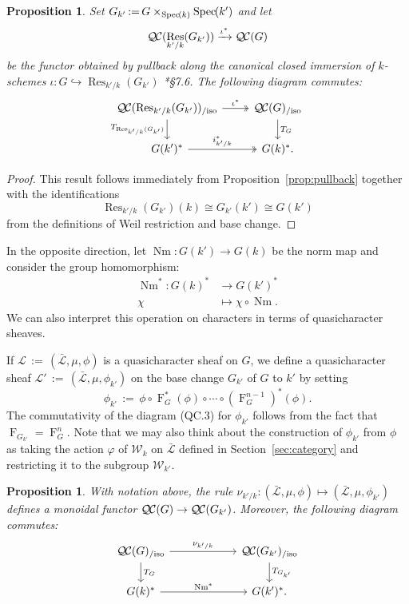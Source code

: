 \documentclass{amsart}
\theoremstyle{plain}
\newtheorem{proposition}[theorem]{Proposition}
\theoremstyle{definition}
\theoremstyle{remark}
\newcommand{\Weil}[1]{\mathcal{W}_{#1}}
\newcommand{\Frob}[1]{\operatorname{F}_{#1}}
\DeclareMathOperator{\Res}{Res}
\DeclareMathOperator{\Nm}{Nm}
\newcommand{\Spec}[1]{{\operatorname{Spec}\hskip-1pt( #1 )}}
\newcommand{\ceq}{{\, :=\, }}
\newcommand{\qcs}[1]{{\mathcal{#1}}}
\newcommand{\gqcs}[1]{{\mathcal{\bar #1}}}
\newcommand{\QC}{{\mathcal{Q\hskip-0.8pt C}}}
\newcommand{\QCiso}[1]{\QC(#1)_{/\text{iso}}}
\newcommand{\TrFrob}[1]{T_{#1}}
\begin{document}
\begin{proposition} \label{prop:csbe}
Set $G_{k'} \ceq G\times_\Spec{k} \Spec{k'}$ and let
\[
\QC(\Res_{k'/k}(G_{k'})) \xrightarrow{\iota^*} \QC(G)
\]
be the functor obtained by pullback along the canonical closed immersion of $k$-schemes
$\iota : G \hookrightarrow \Res_{k'/k}(G_{k'})$
\cite{bosch-lutkebohmert-reynaud:NeronModels}*{\S 7.6}.
The following diagram commutes:
\[
\begin{tikzcd}
\QCiso{\Res_{k'/k}(G_{k'})} \arrow[two heads]{r}{\iota^*} \dar[swap]{\TrFrob{\Res_{k'/k}(G_{k'})}} & \QCiso{G} \dar{\TrFrob{G}} \\
G(k')^* \arrow[two heads]{r}{i_{k'/k}^*} & G(k)^*.
\end{tikzcd}
\]
\end{proposition}
\begin{proof}
This result follows immediately from Proposition~\ref{prop:pullback} together with the identifications
\[
\Res_{k'/k}(G_{k'})(k) \cong G_{k'}(k') \cong G(k')
\]
from the definitions of Weil restriction and base change.
\end{proof}

In the opposite direction, let $\Nm : G(k') \to G(k)$ be the norm map and consider the group homomorphism:
\begin{align*}
\Nm^* : G(k)^* &\to G(k')^* \\
\chi &\mapsto \chi\circ \Nm.
\end{align*}
We can also interpret this operation on characters in terms of quasicharacter sheaves.

If $\qcs{L} \ceq (\gqcs{L}, \mu, \phi)$ is a quasicharacter sheaf on $G$, we define
a quasicharacter sheaf $\qcs{L}' \ceq (\gqcs{L}, \mu, \phi_{k'})$ on the base change
$G_{k'}$ of $G$ to $k'$ by setting
\[
\phi_{k'} \ceq \phi \circ \Frob{G}^*(\phi) \circ \cdots \circ (\Frob{G}^{n-1})^*(\phi).
\]
The commutativity of the diagram (QC.3) for $\phi_{k'}$
follows from the fact that $\Frob{G_{k'}} = \Frob{G}^n$.
Note that we may also think about the construction of $\phi_{k'}$ from $\phi$
as taking the action $\varphi$ of $\Weil{k}$ on $\gqcs{L}$
defined in Section~\ref{sec:category} and restricting it to the subgroup $\Weil{k'}$.

\begin{proposition}\label{prop:basechange}
With notation above,
the rule $\nu_{k'/k}: (\gqcs{L}, \mu, \phi) \mapsto (\gqcs{L}, \mu, \phi_{k'})$
 defines a monoidal functor $\QC(G) \to \QC(G_{k'})$.
 Moreover, the following diagram commutes:
\[
\begin{tikzcd}[column sep=60]
\QCiso{G} \rar{\nu_{k'/k}} \dar{\TrFrob{G}} & \QCiso{G_{k'}} \dar{\TrFrob{G_{k'}}} \\
G(k)^*  \rar{\Nm^*} & G(k')^*.
\end{tikzcd}
\]
\end{proposition}
\end{document}
